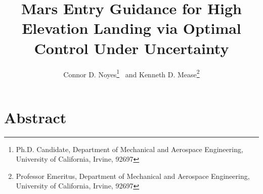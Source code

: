 \documentclass[journal ]{new-aiaa}
\title{Mars Entry Guidance for High Elevation Landing via Optimal Control Under Uncertainty}
\begin{document}
\author{Connor D. Noyes\thanks{Ph.D. Candidate, Department of Mechanical and Aerospace Engineering, University of California, Irvine, 92697} \ and Kenneth D. Mease\thanks{Professor Emeritus, Department of Mechanical and Aerospace Engineering, University of California, Irvine, 92697}}
\maketitle





\section*{Abstract}
\end{document}
